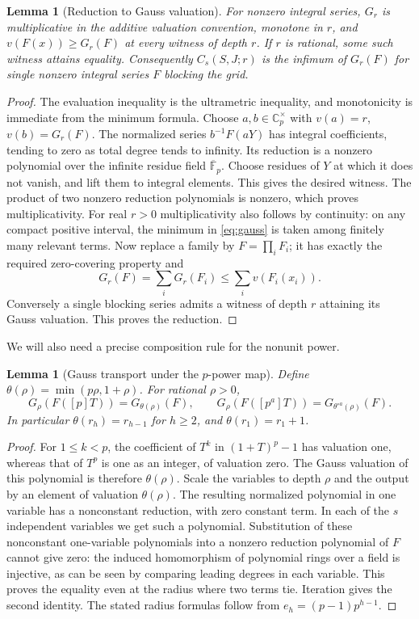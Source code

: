 \documentclass[11pt]{article}
\newtheorem{lemma}[theorem]{Lemma}
\theoremstyle{definition}
\newcommand{\Cp}{\mathbb C_p}
\begin{document}
\begin{lemma}[Reduction to Gauss valuation]\label{lem:reduce}
For nonzero integral series, $G_r$ is multiplicative in the additive valuation convention, monotone in $r$, and $v(F(x))\ge G_r(F)$ at every witness of depth $r$. If $r$ is rational, some such witness attains equality. Consequently $C_s(S,J;r)$ is the infimum of $G_r(F)$ for single nonzero integral series $F$ blocking the grid.
\end{lemma}
\begin{proof}
The evaluation inequality is the ultrametric inequality, and monotonicity is immediate from the minimum formula. Choose $a,b\in\Cp^\times$ with $v(a)=r$, $v(b)=G_r(F)$. The normalized series $b^{-1}F(aY)$ has integral coefficients, tending to zero as total degree tends to infinity. Its reduction is a nonzero polynomial over the infinite residue field $\overline{\mathbb F}_p$. Choose residues of $Y$ at which it does not vanish, and lift them to integral elements. This gives the desired witness. The product of two nonzero reduction polynomials is nonzero, which proves multiplicativity. For real $r>0$ multiplicativity also follows by continuity: on any compact positive interval, the minimum in \eqref{eq:gauss} is taken among finitely many relevant terms. Now replace a family by $F=\prod_iF_i$; it has exactly the required zero-covering property and
\[
 G_r(F)=\sum_i G_r(F_i)\le\sum_i v(F_i(x_i)).
\]
Conversely a single blocking series admits a witness of depth $r$ attaining its Gauss valuation. This proves the reduction.
\end{proof}

We will also need a precise composition rule for the nonunit power.
\begin{lemma}[Gauss transport under the $p$-power map]\label{lem:transport}
Define $\theta(\rho)=\min(p\rho,1+\rho)$. For rational $\rho>0$,
\[
 G_\rho(F([p]T))=G_{\theta(\rho)}(F),\qquad
 G_\rho(F([p^a]T))=G_{\theta^{\circ a}(\rho)}(F).
\]
In particular $\theta(r_h)=r_{h-1}$ for $h\ge2$, and $\theta(r_1)=r_1+1$.
\end{lemma}
\begin{proof}
For $1\le k<p$, the coefficient of $T^k$ in $(1+T)^p-1$ has valuation one, whereas that of $T^p$ is one as an integer, of valuation zero. The Gauss valuation of this polynomial is therefore $\theta(\rho)$. Scale the variables to depth $\rho$ and the output by an element of valuation $\theta(\rho)$. The resulting normalized polynomial in one variable has a nonconstant reduction, with zero constant term. In each of the $s$ independent variables we get such a polynomial. Substitution of these nonconstant one-variable polynomials into a nonzero reduction polynomial of $F$ cannot give zero: the induced homomorphism of polynomial rings over a field is injective, as can be seen by comparing leading degrees in each variable. This proves the equality even at the radius where two terms tie. Iteration gives the second identity. The stated radius formulas follow from $e_h=(p-1)p^{h-1}$.
\end{proof}
\end{document}
